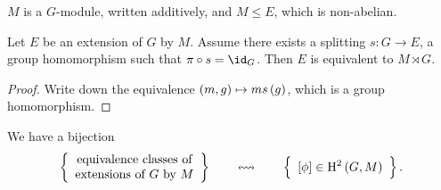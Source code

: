 \begin{notation}
$ M $ is a $ G $-module, written additively, and $ M \le E $, which is non-abelian.
\end{notation}

\begin{proposition}
Let $ E $ be an extension of $ G $ by $ M $. Assume there exists a splitting $ s : G \to E $, a group homomorphism such that $ \pi \circ s = \id_G $. Then $ E $ is equivalent to $ M \rtimes G $.
\end{proposition}

\begin{proof}
Write down the equivalence $ \br{m, g} \mapsto ms\br{g} $, which is a group homomorphism.
\end{proof}

\pagebreak

\begin{theorem}
We have a bijection
$$ \correspondence{\text{equivalence classes of} \\ \text{extensions of} \ G \ \text{by} \ M}{\sbr{\phi} \in \H^2\br{G, M}}. $$
\end{theorem}

